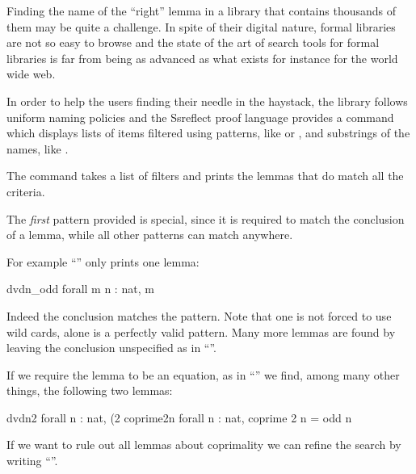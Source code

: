 \label{sec:search}


Finding the name of the ``right'' lemma in a library that contains
thousands of them may be quite a challenge. In spite of their digital
nature, formal libraries are not so easy to browse and the state
of the art of search tools for formal libraries is far from being as
advanced as what exists for instance for the world wide web.

In order to help the users finding their needle in the haystack,
the \mcbMC{} library follows uniform naming policies and the Ssreflect
proof language provides a  command which displays lists of
items filtered using patterns, like \C{(_ * _ + _)}
or , and substrings of the names, like .



The  command takes a list of filters and prints the lemmas
that do match all the criteria.

The \emph{first} pattern provided is special, since it is required to match
the conclusion of a lemma, while all other patterns can match anywhere.

For example ``'' only prints one lemma:

\begin{coq}{}{}
dvdn_odd  forall m n : nat, m %
\end{coq}
Indeed the conclusion matches the pattern.  Note that one is not forced to
use wild cards,  alone is a perfectly valid pattern.  Many more
lemmas are found by leaving the conclusion unspecified as in ``''.

If we require the lemma to be an equation, as in ``'' we find,
among many other things, the following two lemmas:

\begin{coqout}{}{}
dvdn2  forall n : nat, (2 %
coprime2n  forall n : nat, coprime 2 n = odd n
\end{coqout}
If we want to rule out all lemmas about coprimality we can refine the
search by writing ``''.


